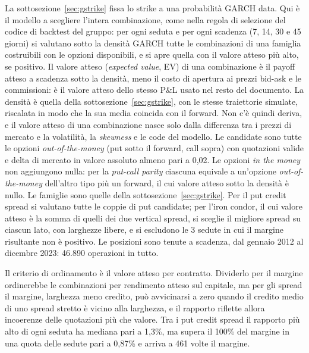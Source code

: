 \documentclass[11pt,a4paper]{article}
\begin{document}
La sottosezione~\ref{sec:gstrike} fissa lo strike a una probabilità GARCH data. Qui è il modello a scegliere l'intera combinazione, come nella regola di selezione del codice di backtest del gruppo: per ogni seduta e per ogni scadenza (7, 14, 30 e 45 giorni) si valutano sotto la densità GARCH tutte le combinazioni di una famiglia costruibili con le opzioni disponibili, e si apre quella con il valore atteso più alto, se positivo. Il valore atteso (\emph{expected value}, EV) di una combinazione è il payoff atteso a scadenza sotto la densità, meno il costo di apertura ai prezzi bid-ask e le commissioni: è il valore atteso dello stesso P\&L usato nel resto del documento. La densità è quella della sottosezione~\ref{sec:gstrike}, con le stesse traiettorie simulate, riscalata in modo che la sua media coincida con il forward. Non c'è quindi deriva, e il valore atteso di una combinazione nasce solo dalla differenza tra i prezzi di mercato e la volatilità, la \emph{skewness} e le code del modello. Le candidate sono tutte le opzioni \emph{out-of-the-money} (put sotto il forward, call sopra) con quotazioni valide e delta di mercato in valore assoluto almeno pari a 0{,}02. Le opzioni \emph{in the money} non aggiungono nulla: per la \emph{put-call parity} ciascuna equivale a un'opzione \emph{out-of-the-money} dell'altro tipo più un forward, il cui valore atteso sotto la densità è nullo. Le famiglie sono quelle della sottosezione~\ref{sec:gstrike}. Per il put credit spread si valutano tutte le coppie di put candidate; per l'iron condor, il cui valore atteso è la somma di quelli dei due vertical spread, si sceglie il migliore spread su ciascun lato, con larghezze libere, e si escludono le 3 sedute in cui il margine risultante non è positivo. Le posizioni sono tenute a scadenza, dal gennaio 2012 al dicembre 2023: 46.890 operazioni in tutto.

Il criterio di ordinamento è il valore atteso per contratto. Dividerlo per il margine ordinerebbe le combinazioni per rendimento atteso sul capitale, ma per gli spread il margine, larghezza meno credito, può avvicinarsi a zero quando il credito medio di uno spread stretto è vicino alla larghezza, e il rapporto riflette allora incoerenze delle quotazioni più che valore. Tra i put credit spread il rapporto più alto di ogni seduta ha mediana pari a 1{,}3\%, ma supera il 100\% del margine in una quota delle sedute pari a 0{,}87\% e arriva a 461 volte il margine.
\end{document}

